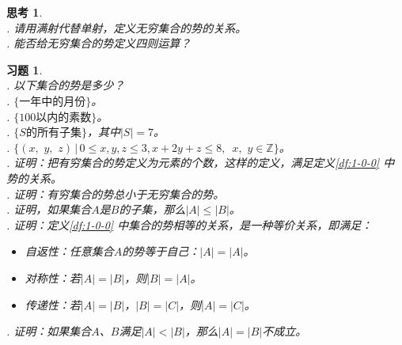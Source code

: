 \documentclass[12pt,UTF8]{ctexbook}
\theoremstyle{definition}
\theoremstyle{plain}
\newtheorem{sk}{思考}[section]
\newtheorem{xt}{习题}[section]
\begin{document}
\begin{sk}
    \mbox{} \\
    . 请用满射代替单射，定义无穷集合的势的关系。\\
    . 能否给无穷集合的势定义四则运算？
\end{sk}

\begin{xt}
    \mbox{} \\
    . 以下集合的势是多少？\\
    . $\{\mbox{一年中的月份}\}$。\\ 
    . $\{100\mbox{以内的素数}\}$。\\ 
    . $\{S\mbox{的所有子集}\}$，其中$|S| = 7$。\\ 
    . $\{(x, \,\, y, \,\, z) \, | \, 0 \leqslant x, y, z \leqslant 3, x + 2y + z \leqslant 8,\,\,\, x,\,\, y \in  \mathbb{Z}\}$。\\ 
    . 证明：把有穷集合的势定义为元素的个数，这样的定义，满足定义\ref{df:1-0-0} 中势的关系。\\
    . 证明：有穷集合的势总小于无穷集合的势。\\
    . 证明，如果集合$A$是$B$的子集，那么$|A| \leqslant |B|$。\\
    . 证明：定义\ref{df:1-0-0} 中集合的势相等的关系，是一种等价关系，即满足：
    \indent \begin{itemize}
        \item 自返性：任意集合$A$的势等于自己：$|A| = |A|$。
        \item 对称性：若$|A| = |B|$，则$|B| = |A|$。
        \item 传递性：若$|A| = |B|$，$|B| = |C|$，则$|A| = |C|$。
    \end{itemize}

    . 证明：如果集合$A$、$B$满足$|A| < |B|$，那么$|A| = |B|$不成立。



\end{xt}
\end{document}
